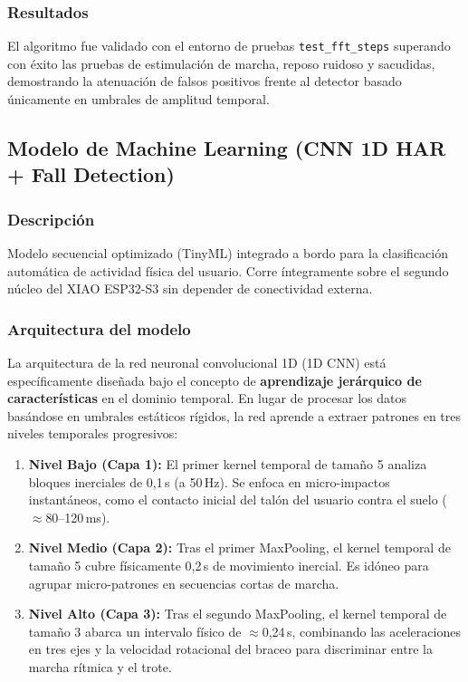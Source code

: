\documentclass[letterpaper,11pt]{article}
\begin{document}
\subsubsection{Resultados}

El algoritmo fue validado con el entorno de pruebas \texttt{test\_fft\_steps} superando con éxito las pruebas de estimulación de marcha, reposo ruidoso y sacudidas, demostrando la atenuación de falsos positivos frente al detector basado únicamente en umbrales de amplitud temporal.

\subsection{Modelo de Machine Learning (CNN 1D HAR + Fall Detection)}

\subsubsection{Descripción}

Modelo secuencial optimizado (TinyML) integrado a bordo para la clasificación automática de actividad física del usuario. Corre íntegramente sobre el segundo núcleo del XIAO ESP32-S3 sin depender de conectividad externa.

\subsubsection{Arquitectura del modelo}

La arquitectura de la red neuronal convolucional 1D (1D CNN) está específicamente diseñada bajo el concepto de \textbf{aprendizaje jerárquico de características} en el dominio temporal. En lugar de procesar los datos basándose en umbrales estáticos rígidos, la red aprende a extraer patrones en tres niveles temporales progresivos:
\begin{enumerate}
    \item \textbf{Nivel Bajo (Capa 1):} El primer kernel temporal de tamaño 5 analiza bloques inerciales de 0,1\,s (a 50\,Hz). Se enfoca en micro-impactos instantáneos, como el contacto inicial del talón del usuario contra el suelo ($\approx$80--120\,ms).
    \item \textbf{Nivel Medio (Capa 2):} Tras el primer MaxPooling, el kernel temporal de tamaño 5 cubre físicamente 0,2\,s de movimiento inercial. Es idóneo para agrupar micro-patrones en secuencias cortas de marcha.
    \item \textbf{Nivel Alto (Capa 3):} Tras el segundo MaxPooling, el kernel temporal de tamaño 3 abarca un intervalo físico de $\approx$0,24\,s, combinando las aceleraciones en tres ejes y la velocidad rotacional del braceo para discriminar entre la marcha rítmica y el trote.
\end{enumerate}
\end{document}
